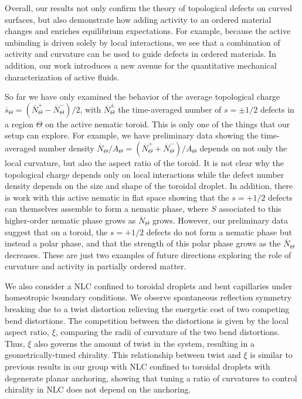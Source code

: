 Overall, our results not only confirm the theory of topological defects on curved surfaces, but also demonstrate how adding activity to an ordered material changes and enriches equilibrium expectations.
For example, because the active unbinding is driven solely by local interactions, we see that a combination of activity and curvature can be used to guide defects in ordered materials.
In addition, our work introduces a new avenue for the quantitative mechanical characterization of active fluids.

So far we have only examined the behavior of the average topological charge $\overbar{s}_{\Theta} = (\overbar{N}^{+}_{\Theta} - \overbar{N}^{-}_{\Theta})/2$, with $\overbar{N}^{\pm}_{\Theta}$ the time-averaged number of $s = \pm1/2$ defects in a region $\Theta$ on the active nematic toroid.
This is only one of the things that our setup can explore.
For example, we have preliminary data showing the time-averaged number density $\overbar{N}_{\Theta}/A_{\Theta} = (\overbar{N}^{+}_{\Theta} + \overbar{N}^{-}_{\Theta})/A_{\Theta}$ depends on not only the local curvature, but also the aspect ratio of the toroid.
It is not clear why the topological charge depends only on local interactions while the defect number density depends on the size and shape of the toroidal droplet.
In addition, there is work with this active nematic in flat space showing that the $s = +1/2$ defects can themselves assemble to form a nematic phase, where $S$ associated to this higher-order nematic phase grows as $\overbar{N}_{\Theta}$ grows.
However, our preliminary data suggest that on a toroid, the $s = +1/2$ defects do not form a nematic phase but instead a polar phase, and that the strength of this polar phase grows as the $\overbar{N}_{\Theta}$ decreases.
These are just two examples of future directions exploring the role of curvature and activity in partially ordered matter.

We also consider a NLC confined to toroidal droplets and bent capillaries under homeotropic boundary conditions.
We observe spontaneous reflection symmetry breaking due to a twist distortion relieving the energetic cost of two competing bend distortions.
The competition between the distortions is given by the local aspect ratio, $\xi$, comparing the radii of curvature of the two bend distortions.
Thus, $\xi$ also governs the amount of twist in the system, resulting in a geometrically-tuned chirality.
This relationship between twist and $\xi$ is similar to previous results in our group with NLC confined to toroidal droplets with degenerate planar anchoring, showing that tuning a ratio of curvatures to control chirality in NLC does not depend on the anchoring.

